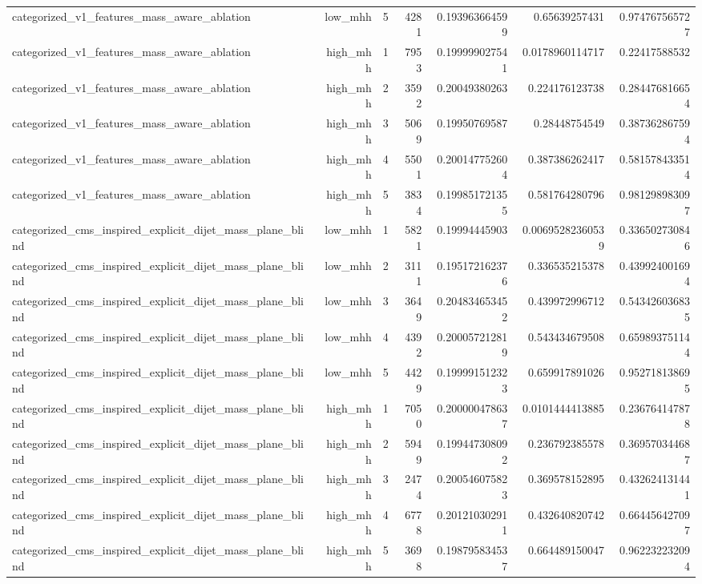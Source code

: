 \begin{table}[htbp]
{\begin{tabular}{lrrrrrr}
categorized\_v1\_features\_mass\_aware\_ablation & low\_mhh & 5 & 4281 & 0.193963664599 & 0.65639257431 & 0.974767565727 \\
categorized\_v1\_features\_mass\_aware\_ablation & high\_mhh & 1 & 7953 & 0.199999027541 & 0.0178960114717 & 0.22417588532 \\
categorized\_v1\_features\_mass\_aware\_ablation & high\_mhh & 2 & 3592 & 0.20049380263 & 0.224176123738 & 0.284476816654 \\
categorized\_v1\_features\_mass\_aware\_ablation & high\_mhh & 3 & 5069 & 0.19950769587 & 0.28448754549 & 0.387362867594 \\
categorized\_v1\_features\_mass\_aware\_ablation & high\_mhh & 4 & 5501 & 0.200147752604 & 0.387386262417 & 0.581578433514 \\
categorized\_v1\_features\_mass\_aware\_ablation & high\_mhh & 5 & 3834 & 0.199851721355 & 0.581764280796 & 0.981298983097 \\
categorized\_cms\_inspired\_explicit\_dijet\_mass\_plane\_blind & low\_mhh & 1 & 5821 & 0.19994445903 & 0.00695282360539 & 0.336502730846 \\
categorized\_cms\_inspired\_explicit\_dijet\_mass\_plane\_blind & low\_mhh & 2 & 3111 & 0.195172162376 & 0.336535215378 & 0.439924001694 \\
categorized\_cms\_inspired\_explicit\_dijet\_mass\_plane\_blind & low\_mhh & 3 & 3649 & 0.204834653452 & 0.439972996712 & 0.543426036835 \\
categorized\_cms\_inspired\_explicit\_dijet\_mass\_plane\_blind & low\_mhh & 4 & 4392 & 0.200057212819 & 0.543434679508 & 0.659893751144 \\
categorized\_cms\_inspired\_explicit\_dijet\_mass\_plane\_blind & low\_mhh & 5 & 4429 & 0.199991512323 & 0.659917891026 & 0.952718138695 \\
categorized\_cms\_inspired\_explicit\_dijet\_mass\_plane\_blind & high\_mhh & 1 & 7050 & 0.200000478637 & 0.0101444413885 & 0.236764147878 \\
categorized\_cms\_inspired\_explicit\_dijet\_mass\_plane\_blind & high\_mhh & 2 & 5949 & 0.199447308092 & 0.236792385578 & 0.369570344687 \\
categorized\_cms\_inspired\_explicit\_dijet\_mass\_plane\_blind & high\_mhh & 3 & 2474 & 0.200546075823 & 0.369578152895 & 0.432624131441 \\
categorized\_cms\_inspired\_explicit\_dijet\_mass\_plane\_blind & high\_mhh & 4 & 6778 & 0.201210302911 & 0.432640820742 & 0.664456427097 \\
categorized\_cms\_inspired\_explicit\_dijet\_mass\_plane\_blind & high\_mhh & 5 & 3698 & 0.198795834537 & 0.664489150047 & 0.962232232094 \\
\bottomrule
\end{tabular}
}
\end{table}
